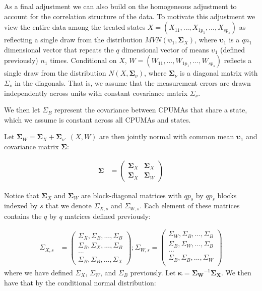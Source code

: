 As a final adjustment we can also build on the homogeneous adjustment to account for the correlation structure of the data. To motivate this adjustment we view the entire data among the treated states $X = (X_{11}, ..., X_{1p_1}, ..., X_{sp_s})$ as reflecting a single draw from the distribution $MVN(\boldsymbol{\upsilon}_1, \mathbf{\Sigma}_X)$, where $\boldsymbol{\upsilon}_1$ is a $qn_1$ dimensional vector that repeats the $q$ dimensional vector of means $\upsilon_1$ (defined previously) $n_1$ times. Conditional on $X$, $W = (W_{11}, ..., W_{1p_1}, ..., W_{sp_s})$ reflects a single draw from the distribution $N(X, \boldsymbol{\Sigma}_{\nu})$, where $\boldsymbol{\Sigma}_{\nu}$ is a diagonal matrix with $\Sigma_{\nu}$ in the diagonals. That is, we assume that the measurement errors are drawn independently across units with constant covariance matrix $\Sigma_{\nu}$.

We then let $\Sigma_B$ represent the covariance between CPUMAs that share a state, which we assume is constant across all CPUMAs and states. 

Let $\boldsymbol{\Sigma}_W = \boldsymbol{\Sigma}_X + \boldsymbol{\Sigma}_{\nu}$. $(X, W)$ are then jointly normal with common mean $\boldsymbol{\upsilon}_1$ and covariance matrix $\boldsymbol{\Sigma}$: 

\begin{align}\label{eqn:xcormodel}
\boldsymbol{\Sigma} &= \begin{pmatrix}
\mathbf{\Sigma}_X & \mathbf{\Sigma}_X \\
\mathbf{\Sigma}_X & \mathbf{\Sigma}_W
\end{pmatrix} 
\end{align}

Notice that $\mathbf{\Sigma}_X$ and $\mathbf{\Sigma}_W$ are block-diagonal matrices with $qp_s$ by $qp_s$ blocks indexed by $s$ that we denote $\Sigma_{X, s}$ and $\Sigma_{W, s}$. Each element of these matrices contains the $q$ by $q$ matrices defined previously: 

\begin{align}\label{eqn:xcormodel2}
\Sigma_{X, s} &= \begin{pmatrix}
\Sigma_{X}, \Sigma_B, ..., \Sigma_B \\
\Sigma_B, \Sigma_{X}, ..., \Sigma_B \\
... \\
\Sigma_B, \Sigma_B, ..., \Sigma_{X}
\end{pmatrix};
\Sigma_{W, s} = \begin{pmatrix}
\Sigma_{W}, \Sigma_B, ..., \Sigma_B \\
\Sigma_B, \Sigma_{W}, ..., \Sigma_B \\
... \\
\Sigma_B, \Sigma_B, ..., \Sigma_{W} \\
\end{pmatrix}
\end{align}
%
where we have defined $\Sigma_{X}$, $\Sigma_{W}$, and $\Sigma_B$ previously. 
Let $\boldsymbol{\kappa} = \mathbf{\Sigma_W}^{-1}\mathbf{\Sigma_X}$. We then have that by the conditional normal distribution:

